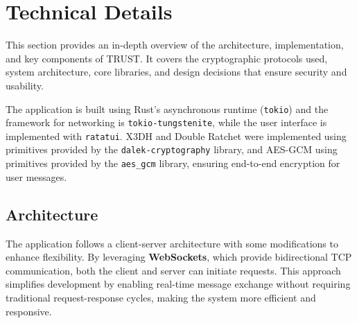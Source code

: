\chapter{Technical Details}
\label{cha:TechnicalDetails}

This section provides an in-depth overview of the architecture, implementation, and key components of TRUST. It covers the cryptographic protocols used, system architecture, core libraries, and design decisions that ensure security and usability.

The application is built using Rust’s asynchronous runtime (\texttt{tokio}) and the  framework for networking is \texttt{tokio-tungstenite}, while the user interface is implemented with \texttt{ratatui}. X3DH and Double Ratchet were implemented using primitives provided by the \texttt{dalek-cryptography} library, and AES-GCM using primitives provided by the \texttt{aes\_gcm} library, ensuring end-to-end encryption for user messages.


\section{Architecture}
\label{sec:Architecture}

The application follows a client-server architecture with some modifications to enhance flexibility. By leveraging \textbf{WebSockets}, which provide bidirectional TCP communication, both the client and server can initiate requests. This approach simplifies development by enabling real-time message exchange without requiring traditional request-response cycles, making the system more efficient and responsive.


